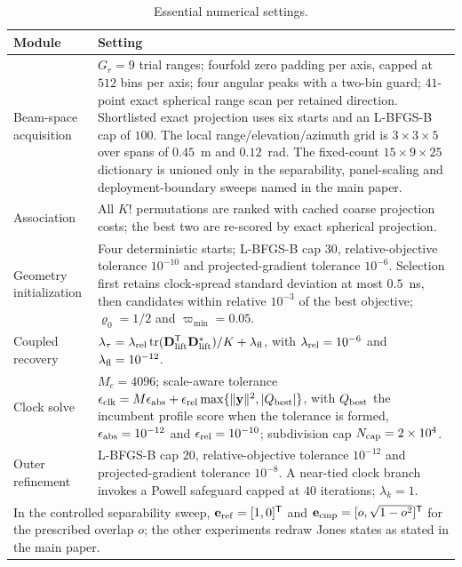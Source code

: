 \documentclass[journal,letterpaper]{IEEEtran}
\newcommand{\by}{\mathbf{y}}
\newcommand{\be}{\mathbf{e}}
\newcommand{\bD}{\mathbf{D}}
\newcommand{\tr}{\operatorname{tr}}
\begin{document}
\begin{table}[!t]
\caption{Essential numerical settings.}
\label{tab:s_settings}
\centering
\scriptsize
\setlength{\tabcolsep}{4pt}
\renewcommand{\arraystretch}{1.08}
\begin{tabular}{@{}p{}p{}@{}}
\toprule
Module & Setting \\
\midrule
Beam-space acquisition & $G_r=9$ trial ranges; fourfold zero padding per
axis, capped at $512$ bins per axis; four angular peaks with a two-bin guard;
$41$-point exact spherical range scan per retained direction.  Shortlisted
exact projection uses six starts and an L-BFGS-B cap of $100$.  The local
range/elevation/azimuth grid is $3\times3\times5$ over spans of $0.45$~m and
$0.12$~rad.  The fixed-count $15\times9\times25$ dictionary is unioned only
in the separability, panel-scaling and deployment-boundary sweeps named in the
main paper. \\
Association & All $K!$ permutations are ranked with cached coarse projection
costs; the best two are re-scored by exact spherical projection. \\
Geometry initialization & Four deterministic starts; L-BFGS-B cap $30$,
relative-objective tolerance $10^{-10}$ and projected-gradient tolerance
$10^{-6}$.  Selection first retains clock-spread standard deviation at most
$0.5$~ns, then candidates within relative $10^{-3}$ of the best objective;
$\varrho_0=1/2$ and $\varpi_{\min}=0.05$. \\
Coupled recovery &
$\lambda_\tau=\lambda_{\rm rel}\tr(\bD_{\rm lift}^{\mathsf T}
\bD_{\rm lift}^{\ast})/K+\lambda_{\rm fl}$, with
$\lambda_{\rm rel}=10^{-6}$ and $\lambda_{\rm fl}=10^{-12}$. \\
Clock solve & $M_c=4096$; scale-aware tolerance
$\epsilon_{\rm clk}=M\epsilon_{\rm abs}+\epsilon_{\rm rel}
\max\{\|\by\|^2,|Q_{\rm best}|\}$, with $Q_{\rm best}$ the incumbent
profile score when the tolerance is formed, $\epsilon_{\rm abs}=10^{-12}$
and $\epsilon_{\rm rel}=10^{-10}$; subdivision cap
$N_{\rm cap}=2\times10^4$. \\
Outer refinement & L-BFGS-B cap $20$, relative-objective tolerance $10^{-12}$
and projected-gradient tolerance $10^{-8}$.  A near-tied clock branch invokes
a Powell safeguard capped at $40$ iterations; $\lambda_k=1$. \\
\bottomrule
\multicolumn{2}{p{0.96\textwidth}}{\scriptsize In the controlled separability
sweep, $\be_{\rm ref}=[1,0]^{\mathsf T}$ and
$\be_{\rm cmp}=[o,\sqrt{1-o^2}]^{\mathsf T}$ for the prescribed overlap $o$;
the other experiments redraw Jones states as stated in the main paper.}
\end{tabular}
\end{table}
\end{document}
